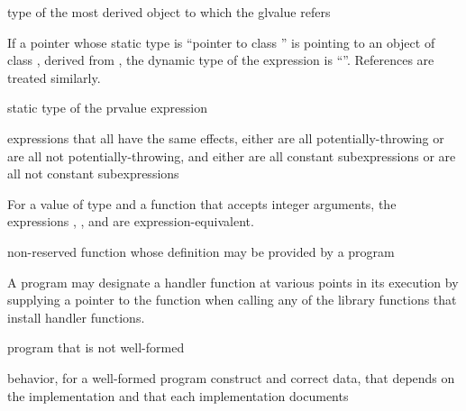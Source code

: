%
 type of the most derived object to which the
glvalue refers

\begin{example}
If a pointer  whose static type is ``pointer to
class '' is pointing to an object of class , derived
from , the dynamic type of the
expression  is ``''. References are
treated similarly.
\end{example}

%
 static type of the prvalue expression

%
expressions that all have the same effects,
either
are all potentially-throwing or
are all not potentially-throwing,
and
either
are all constant subexpressions or
are all not constant subexpressions

\begin{example}
For a value  of type 
and a function  that accepts integer arguments,
the expressions
,
,
and
are expression-equivalent.
\end{example}

%
non-reserved function whose definition may be provided by a \Cpp{} program

\begin{defnote}
A \Cpp{} program may designate a handler function at various points in its execution by
supplying a pointer to the function when calling any of the library functions that install
handler functions.
\end{defnote}

%
program that is not well-formed

%
behavior, for a well-formed program construct and correct data, that
depends on the implementation and that each implementation documents

